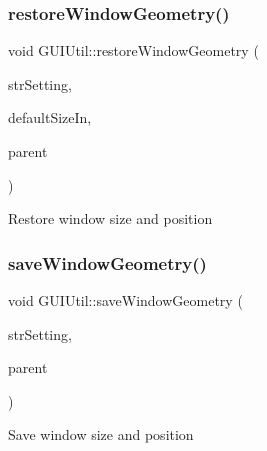 \subsubsection{\texorpdfstring{restoreWindowGeometry()}{restoreWindowGeometry()}}
{\footnotesize\ttfamily void G\+U\+I\+Util\+::restore\+Window\+Geometry (\begin{DoxyParamCaption}\item[{const Q\+String \&}]{str\+Setting,  }\item[{const Q\+Size \&}]{default\+Size\+In,  }\item[{Q\+Widget $\ast$}]{parent }\end{DoxyParamCaption})}

Restore window size and position \mbox{\label{namespace_g_u_i_util_a5bd5d67910917446f2f3aa97d7c8b85a}} 
\subsubsection{\texorpdfstring{saveWindowGeometry()}{saveWindowGeometry()}}
{\footnotesize\ttfamily void G\+U\+I\+Util\+::save\+Window\+Geometry (\begin{DoxyParamCaption}\item[{const Q\+String \&}]{str\+Setting,  }\item[{Q\+Widget $\ast$}]{parent }\end{DoxyParamCaption})}

Save window size and position 